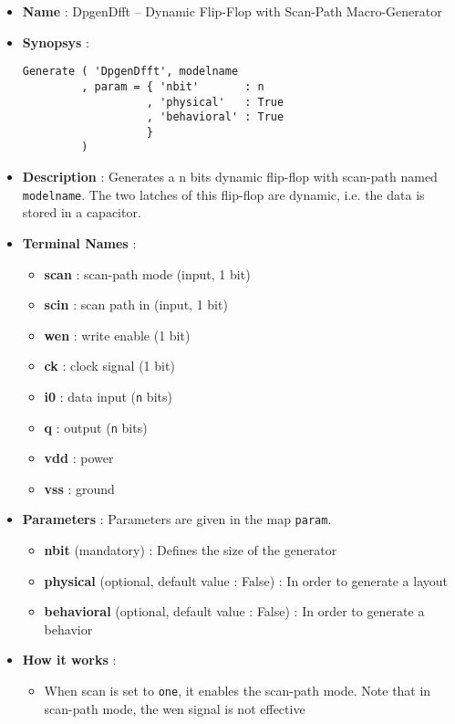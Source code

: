 \begin{itemize}
    \item \textbf{Name} : DpgenDfft -- Dynamic Flip-Flop with Scan-Path Macro-Generator
    \item \textbf{Synopsys} :
\begin{verbatim}
Generate ( 'DpgenDfft', modelname
         , param = { 'nbit'       : n
                   , 'physical'   : True
                   , 'behavioral' : True         
                   }
         )
\end{verbatim}
    \item \textbf{Description} : Generates a n bits dynamic flip-flop with scan-path named \verb-modelname-. The two latches of this flip-flop are dynamic, i.e. the data is stored in a capacitor.
    \item \textbf{Terminal Names} :
    \begin{itemize}
        \item \textbf{scan} : scan-path mode (input, 1 bit)
        \item \textbf{scin} : scan path in (input, 1 bit)
        \item \textbf{wen} : write enable (1 bit)
        \item \textbf{ck} : clock signal (1 bit)
        \item \textbf{i0} : data input (\verb-n- bits)
        \item \textbf{q} : output (\verb-n- bits)
        \item \textbf{vdd} : power
        \item \textbf{vss} : ground
    \end{itemize}
    \item \textbf{Parameters} : Parameters are given in the map \verb-param-.
    \begin{itemize}
        \item \textbf{nbit} (mandatory) : Defines the size of the generator
        \item \textbf{physical} (optional, default value : False) : In order to generate a layout
        \item \textbf{behavioral} (optional, default value : False) : In order to generate a behavior        
    \end{itemize}
    \item \textbf{How it works} : 
    \begin{itemize}
        \item When scan is set to \verb-one-, it enables the scan-path mode. Note that in scan-path mode, the wen signal is not effective

\end{itemize}
\end{itemize}
